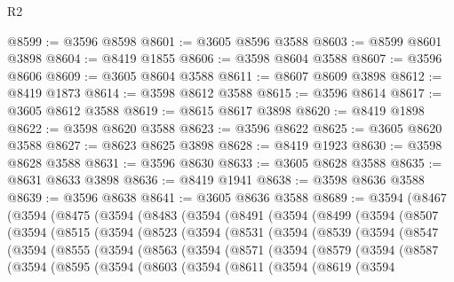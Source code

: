 \begin{lexlean}{R2}
\begin{coremodule}
@8599 := @3596 @8598
@8601 := @3605 @8596 @3588
@8603 := @8599 @8601 @3898
@8604 := @8419 @1855
@8606 := @3598 @8604 @3588
@8607 := @3596 @8606
@8609 := @3605 @8604 @3588
@8611 := @8607 @8609 @3898
@8612 := @8419 @1873
@8614 := @3598 @8612 @3588
@8615 := @3596 @8614
@8617 := @3605 @8612 @3588
@8619 := @8615 @8617 @3898
@8620 := @8419 @1898
@8622 := @3598 @8620 @3588
@8623 := @3596 @8622
@8625 := @3605 @8620 @3588
@8627 := @8623 @8625 @3898
@8628 := @8419 @1923
@8630 := @3598 @8628 @3588
@8631 := @3596 @8630
@8633 := @3605 @8628 @3588
@8635 := @8631 @8633 @3898
@8636 := @8419 @1941
@8638 := @3598 @8636 @3588
@8639 := @3596 @8638
@8641 := @3605 @8636 @3588
@8689 := @3594
    (@8467
      (@3594
        (@8475
          (@3594
            (@8483
              (@3594
                (@8491
                  (@3594
                    (@8499
                      (@3594
                        (@8507
                          (@3594
                            (@8515
                              (@3594
                                (@8523
                                  (@3594
                                    (@8531
                                      (@3594
                                        (@8539
                                          (@3594
                                            (@8547
                                              (@3594
                                                (@8555
                                                  (@3594
                                                    (@8563
                                                      (@3594
                                                        (@8571
                                                          (@3594
                                                            (@8579
                                                              (@3594
                                                                (@8587
                                                                  (@3594
                                                                    (@8595
                                                                      (@3594
                                                                        (@8603
                                                                          (@3594
                                                                            (@8611
                                                                              (@3594
                                                                                (@8619
                                                                                  (@3594

\end{coremodule}
\end{lexlean}

